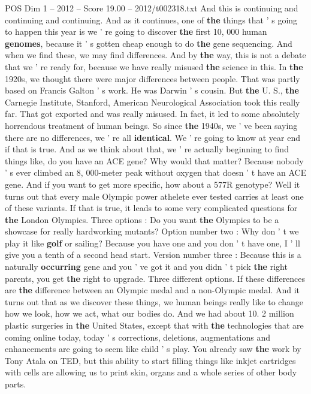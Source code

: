 \begin{textsample}{POS Dim 1 – 2012 – Score 19.00 – 2012/t002318.txt}
And this is continuing and continuing and continuing.
And as it continues, one of \textbf{the} things that ' s going to happen this year is we ' re going to discover \textbf{the} first 10, 000 human \textbf{genomes}, because it ' s gotten cheap enough to do \textbf{the} gene sequencing.
And when we find these, we may find differences.
And by \textbf{the} way, this is not a debate that we ' re ready for, because we have really misused \textbf{the} science in this.
In \textbf{the} 1920s, we thought there were major differences between people.
That was partly based on Francis Galton ' s work.
He was Darwin ' s cousin.
But \textbf{the} U.
S., \textbf{the} Carnegie Institute, Stanford, American Neurological Association took this really far.
That got exported and was really misused.
In fact, it led to some absolutely horrendous treatment of human beings.
So since \textbf{the} 1940s, we ' ve been saying there are no differences, we ' re all \textbf{identical}.
We ' re going to know at year end if that is true.
And as we think about that, we ' re actually beginning to find things like, do you have an ACE gene?
Why would that matter?
Because nobody ' s ever climbed an 8, 000-meter peak without oxygen that doesn ' t have an ACE gene.
And if you want to get more specific, how about a 577R genotype?
Well it turns out that every male Olympic power athelete ever tested carries at least one of these variants.
If that is true, it leads to some very complicated questions for \textbf{the} London Olympics.
Three options : Do you want \textbf{the} Olympics to be a showcase for really hardworking mutants?
Option number two : Why don ' t we play it like \textbf{golf} or sailing?
Because you have one and you don ' t have one, I ' ll give you a tenth of a second head start.
Version number three : Because this is a naturally \textbf{occurring} gene and you ' ve got it and you didn ' t pick \textbf{the} right parents, you get \textbf{the} right to upgrade.
Three different options.
If these differences are \textbf{the} difference between an Olympic medal and a non-Olympic medal.
And it turns out that as we discover these things, we human beings really like to change how we look, how we act, what our bodies do.
And we had about 10. 2 million plastic surgeries in \textbf{the} United States, except that with \textbf{the} technologies that are coming online today, today ' s corrections, deletions, augmentations and enhancements are going to seem like child ' s play.
You already saw \textbf{the} work by Tony Atala on TED, but this ability to start filling things like inkjet cartridges with cells are allowing us to print skin, organs and a whole series of other body parts.

\end{textsample}

